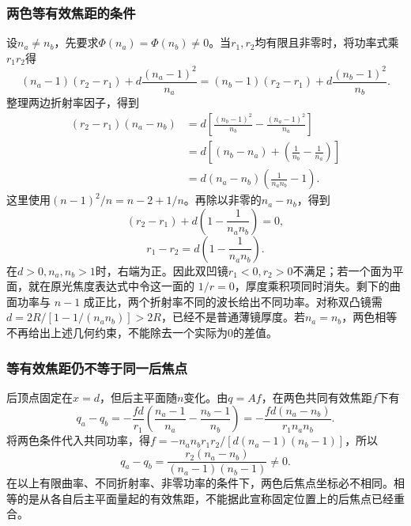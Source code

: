 \documentclass[UTF8,fontset=fandol,a4paper,11pt]{ctexart}
\begin{document}
\subsubsection*{两色等有效焦距的条件}
设$n_a\ne n_b$，先要求$\Phi(n_a)=\Phi(n_b)\ne0$。当$r_1,r_2$均有限且非零时，将功率式乘$r_1r_2$得
\[
(n_a-1)(r_2-r_1)
+d\frac{(n_a-1)^2}{n_a}
=(n_b-1)(r_2-r_1)
+d\frac{(n_b-1)^2}{n_b}.
\]
整理两边折射率因子，得到
\[
\begin{split}
(r_2-r_1)(n_a-n_b)
&=d\left[\frac{(n_b-1)^2}{n_b}
-\frac{(n_a-1)^2}{n_a}\right]\\
&=d\left[(n_b-n_a)
+\left(\frac1{n_b}-\frac1{n_a}\right)\right]\\
&=d(n_a-n_b)\left(\frac1{n_an_b}-1\right).
\end{split}
\]
这里使用$(n-1)^2/n=n-2+1/n$。再除以非零的$n_a-n_b$，得到
\[
(r_2-r_1)+d\left(1-\frac1{n_an_b}\right)=0,
\]\[
\boxed{r_1-r_2=d\left(1-\frac1{n_an_b}\right)}.
\]
在$d>0,n_a,n_b>1$时，右端为正。因此双凹镜$r_1<0,r_2>0$不满足；若一个面为平面，就在原光焦度表达式中令这一面的 $1/r=0$，厚度乘积项同时消失。剩下的曲面功率与 $n-1$ 成正比，两个折射率不同的波长给出不同功率。对称双凸镜需$d=2R/[1-1/(n_an_b)]>2R$，已经不是普通薄镜厚度。若$n_a=n_b$，两色相等不再给出上述几何约束，不能除去一个实际为0的差值。

\subsubsection*{等有效焦距仍不等于同一后焦点}
后顶点固定在$x=d$，但后主平面随$n$变化。由$q=Af$，在两色共同有效焦距$f$下有
\[
q_a-q_b
=-\frac{fd}{r_1}
\left(\frac{n_a-1}{n_a}-\frac{n_b-1}{n_b}\right)
=-\frac{fd(n_a-n_b)}{r_1n_an_b}.
\]
将两色条件代入共同功率，得$f=-n_an_b r_1r_2/[d(n_a-1)(n_b-1)]$，所以
\[
q_a-q_b=\frac{r_2(n_a-n_b)}
{(n_a-1)(n_b-1)}\ne0.
\]
在以上有限曲率、不同折射率、非零功率的条件下，两色后焦点坐标必不相同。相等的是从各自后主平面量起的有效焦距，不能据此宣称固定位置上的后焦点已经重合。
\end{document}

